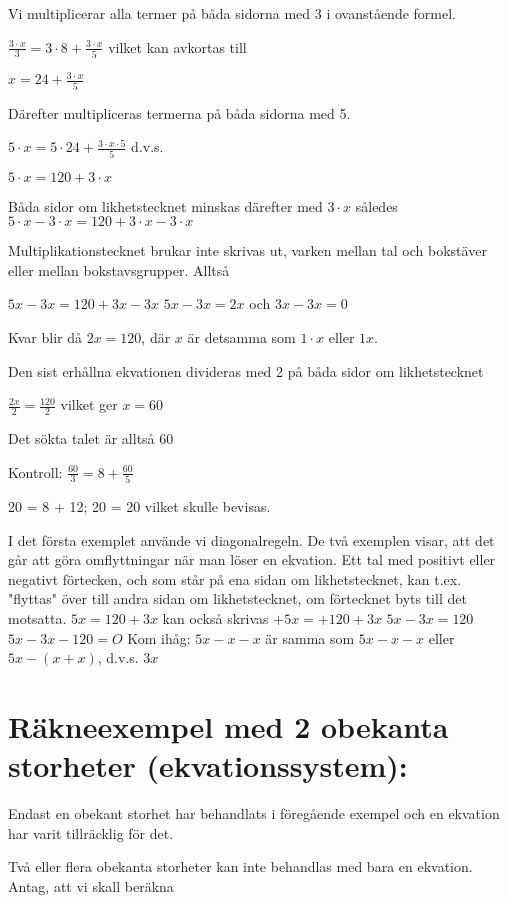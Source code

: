 Vi multiplicerar alla termer på båda sidorna med 3 i ovanstående formel.

\(\frac{3 \cdot x}{3} = 3 \cdot 8 + \frac{3 \cdot x}{5}\) vilket kan avkortas till

\(x = 24 + \frac{3 \cdot x}{5}\)

Därefter multipliceras termerna på båda sidorna med 5.

\(5 \cdot  x = 5 \cdot 24 + \frac{3 \cdot x \cdot 5}{5}\) d.v.s.

\(5 \cdot x = 120 + 3 \cdot x\)

Båda sidor om likhetstecknet minskas därefter med \(3 \cdot x\)
således \(5 \cdot x - 3 \cdot x = 120 + 3 \cdot x - 3 \cdot x\)

Multiplikationstecknet brukar inte skrivas ut, varken mellan tal och bokstäver
eller mellan bokstavsgrupper. Alltså

\(5x - 3x = 120 + 3x - 3x\)
\(5x - 3x = 2x\) och \(3x - 3x = 0\)

Kvar blir då \(2x = 120\),
där \(x\) är detsamma som \(1 \cdot x\) eller \(1x\).

Den sist erhållna ekvationen divideras med 2 på båda sidor om likhetstecknet

\(\frac{2x}{2} = \frac{120}{2}\) vilket ger \(x = 60\)

Det sökta talet är alltså 60

Kontroll: \(\frac{60}{3} = 8 + \frac{60}{5}\)

20 = 8 + 12; 20 = 20 vilket skulle bevisas.

I det första exemplet använde vi diagonalregeln. De två exemplen visar, att det
går att göra omflyttningar när man löser en ekvation. Ett tal med positivt eller
negativt förtecken, och som står på ena sidan om likhetstecknet, kan t.ex.
"flyttas" över till andra sidan om likhetstecknet, om förtecknet byts till det
motsatta.
\(5x = 120 + 3x\) kan också skrivas
\(+5x= +120+ 3x\)
\(5x-3x= 120\)
\(5x- 3x-120 =O\)
Kom ihåg: \(5x-x-x\) är samma som
\(5x-x-x\) eller \(5x-(x+x)\), d.v.s. \(3x\)

\section{Räkneexempel med 2 obekanta storheter
(ekvationssystem):}

Endast en obekant storhet har behandlats i föregående exempel och en ekvation
har varit tillräcklig för det.

Två eller flera obekanta storheter kan inte behandlas med bara en ekvation.
Antag, att vi skall beräkna

